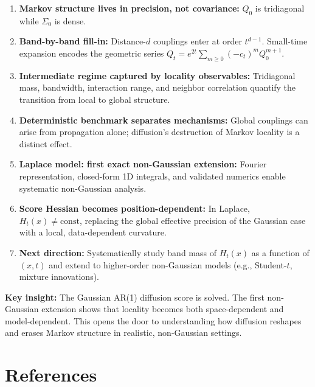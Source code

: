 \documentclass[11pt,a4paper]{article}
\begin{document}
\begin{enumerate}
  \item \textbf{Markov structure lives in precision, not covariance:} $Q_0$ is tridiagonal while $\Sigma_0$ is dense.

  \item \textbf{Band-by-band fill-in:} Distance-$d$ couplings enter at order $t^{d-1}$. Small-time expansion encodes the geometric series $Q_t = e^{2t} \sum_{m \geq 0} (-c_t)^m Q_0^{m+1}$.

  \item \textbf{Intermediate regime captured by locality observables:} Tridiagonal mass, bandwidth, interaction range, and neighbor correlation quantify the transition from local to global structure.

  \item \textbf{Deterministic benchmark separates mechanisms:} Global couplings can arise from propagation alone; diffusion's destruction of Markov locality is a distinct effect.

  \item \textbf{Laplace model: first exact non-Gaussian extension:} Fourier representation, closed-form 1D integrals, and validated numerics enable systematic non-Gaussian analysis.

  \item \textbf{Score Hessian becomes position-dependent:} In Laplace, $H_t(x) \neq \text{const}$, replacing the global effective precision of the Gaussian case with a local, data-dependent curvature.

  \item \textbf{Next direction:} Systematically study band mass of $H_t(x)$ as a function of $(x, t)$ and extend to higher-order non-Gaussian models (e.g., Student-$t$, mixture innovations).
\end{enumerate}

\vspace{0.5cm}
\noindent
\textbf{Key insight:} The Gaussian AR(1) diffusion score is solved. The first non-Gaussian extension shows that locality becomes both space-dependent and model-dependent. This opens the door to understanding how diffusion reshapes and erases Markov structure in realistic, non-Gaussian settings.

\section*{References}
\end{document}
